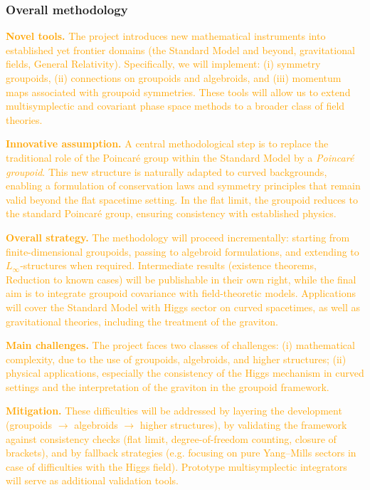 \documentclass[11pt,draftproposal]{msca-pf}
\begin{document}
\subsubsection*{Overall methodology}

\textcolor{orange}{\textbf{Novel tools.} 
The project introduces new mathematical instruments into established yet frontier domains (the Standard Model and beyond, gravitational fields, General Relativity). Specifically, we will implement: (i) symmetry groupoids, (ii) connections on groupoids and algebroids, and (iii) momentum maps associated with groupoid symmetries. These tools will allow us to extend multisymplectic and covariant phase space methods to a broader class of field theories.}

\textcolor{orange}{\textbf{Innovative assumption.} A central methodological step is to replace the traditional role of the Poincaré group within the Standard Model by a \emph{Poincaré groupoid}. This new structure is naturally adapted to curved backgrounds, enabling a formulation of conservation laws and symmetry principles that remain valid beyond the flat spacetime setting. In the flat limit, the groupoid reduces to the standard Poincaré group, ensuring consistency with established physics.}

\textcolor{orange}{\textbf{Overall strategy.} The methodology will proceed incrementally: starting from finite-dimensional groupoids, passing to algebroid formulations, and extending to $L_\infty$-structures when required. Intermediate results (existence theorems, Reduction to known cases) will be publishable in their own right, while the final aim is to integrate groupoid covariance with field-theoretic models. Applications will cover the Standard Model with Higgs sector on curved spacetimes, as well as gravitational theories, including the treatment of the graviton.}

\textcolor{orange}{\textbf{Main challenges.} The project faces two classes of challenges: (i) mathematical complexity, due to the use of groupoids, algebroids, and higher structures; (ii) physical applications, especially the consistency of the Higgs mechanism in curved settings and the interpretation of the graviton in the groupoid framework.}

\textcolor{orange}{\textbf{Mitigation.} These difficulties will be addressed by layering the development (groupoids $\to$ algebroids $\to$ higher structures), by validating the framework against consistency checks (flat limit, degree-of-freedom counting, closure of brackets), and by fallback strategies (e.g. focusing on pure Yang–Mills sectors in case of difficulties with the Higgs field). Prototype multisymplectic integrators will serve as additional validation tools.}
\end{document}
